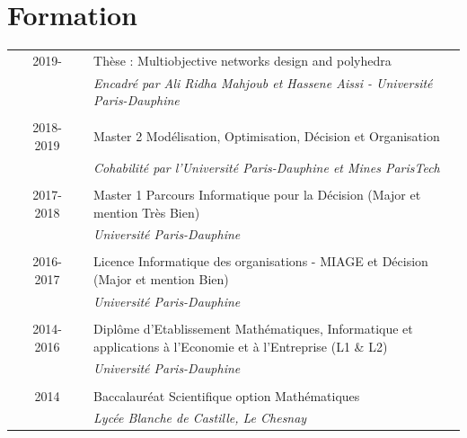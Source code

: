 \documentclass[a4paper,10pt]{article}
\begin{document}
\section{Formation}
\begin{tabular}{p{0.06cm} c p{0.04cm}|p{13cm}}
 & \textsc{2019-} & & Thèse : Multiobjective networks design and polyhedra\\&&&\emph{\small{Encadré par Ali Ridha Mahjoub et Hassene Aissi - Université Paris-Dauphine}}\\\multicolumn{2}{c}{} \\
 & \textsc{2018-2019} & & Master 2 Modélisation, Optimisation, Décision et Organisation\\&&&\emph{\small{Cohabilité par l'Université Paris-Dauphine et Mines ParisTech}}\\\multicolumn{2}{c}{} \\
 & \textsc{2017-2018} & & Master 1 Parcours Informatique pour la Décision (Major et mention Très Bien)\\&&&\emph{\small{Université Paris-Dauphine}}\\\multicolumn{2}{c}{} \\
 & \textsc{2016-2017} & & Licence Informatique des organisations - MIAGE et Décision (Major et mention Bien)\\&&&\emph{\small{Université Paris-Dauphine}}\\\multicolumn{2}{c}{} \\
 & \textsc{2014-2016} & & Diplôme d'Etablissement Mathématiques, Informatique et applications à l'Economie et à l'Entreprise (L1 \& L2) \\&&&\emph{\small{Université Paris-Dauphine}}\\\multicolumn{2}{c}{} \\
 &\textsc{2014} & & Baccalauréat Scientifique option Mathématiques \\&&&\emph{\small{Lycée Blanche de Castille, Le Chesnay}}\\
\end{tabular}
\titlespacing{\section}{0pt}{2pt}{2pt}
\end{document}
